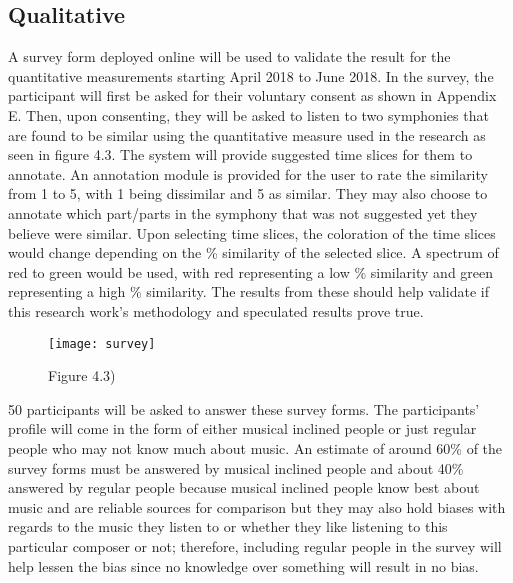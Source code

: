 \subsection{Qualitative}

A survey form deployed online will be used to validate the result for the quantitative measurements starting April 2018 to June 2018. In the survey, the participant will first be asked for their voluntary consent as shown in Appendix E. Then, upon consenting, they will be asked to listen to two symphonies that are found to be similar using the quantitative measure used in the research as seen in figure 4.3. The system will provide suggested time slices for them to annotate. An annotation module is provided for the user to rate the similarity from 1 to 5, with 1 being dissimilar and 5 as similar. They may also choose to annotate which part/parts in the symphony that was not suggested yet they believe were similar. Upon selecting time slices, the coloration of the time slices would change depending on the \% similarity of the selected slice. A spectrum of red to green would be used, with red representing a low \% similarity and green representing a high \% similarity. The results from these should help validate if this research work’s methodology and speculated results prove true.

\begin{figure}[h]
\caption{Figure 4.3)}
\centering
\texttt{[image: survey]}
\end{figure}

50 participants will be asked to answer these survey forms. The participants’ profile will come in the form of either musical inclined people or just regular people who may not know much about music. An estimate of around 60\% of the survey forms must be answered by musical inclined people and about 40\% answered by regular people because musical inclined people know best about music and are reliable sources for comparison but they may also hold biases with regards to the music they listen to or whether they like listening to this particular composer or not; therefore, including regular people in the survey will help lessen the bias since no knowledge over something will result in no bias. 